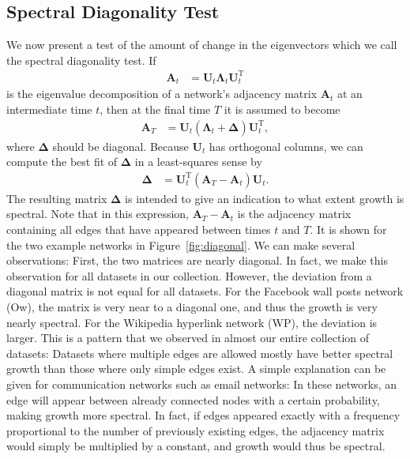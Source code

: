 \documentclass[11pt,a4paper]{book}
\newcommand{\totaltime}{T} %
\begin{document}
\subsection{Spectral Diagonality Test}
\label{sec:spectral-diagonality-test}
We now present a test of the amount of change in the eigenvectors which
we call the spectral diagonality test.  If
\begin{align*}
  \mathbf A_{t}^{\phantom{\mathrm{I}}} &= \mathbf
  U_{t}^{\phantom{\mathrm{I}}}\mathbf \Lambda_{t}^{\phantom{\mathrm
      I}} \mathbf U_{t}^{\mathrm T} 
\end{align*}
is the eigenvalue decomposition of a network's adjacency matrix $\mathbf
A_t$ at an intermediate time $t$, then at the final time $T$ it is
assumed to become
\begin{align*}
  \mathbf A_{\totaltime}^{\phantom {\mathrm I}}&=\mathbf U_{t}^{\phantom
    {\mathrm I}} (\mathbf  
  \Lambda_{t}^{\phantom {\mathrm I}}+\mathbf \Delta)\mathbf
  U_{t}^{\mathrm T},
\end{align*}
where $\mathbf \Delta$ should be diagonal.  
Because $\mathbf U_{t}$ has orthogonal columns, 
we can compute the best fit of $\mathbf \Delta$ in a least-squares
sense by
\begin{align}
  \mathbf \Delta &= \mathbf U_{t}^{\mathrm T} (\mathbf
  A_{\totaltime}^{\phantom {\mathrm I}} - \mathbf 
  A_{t}^{\phantom {\mathrm I}})\mathbf U_{t}^{\phantom
    {\mathrm I}}. \label{eq:diagonality}
\end{align}
The resulting matrix $\mathbf \Delta$ is intended to give an indication to what
extent growth is spectral.  Note that in this expression, $\mathbf
A_{\totaltime} - \mathbf A_{t}$ is the adjacency matrix containing all
edges that have appeared between times $t$ and $T$.  It is shown for the
two example networks in Figure~\ref{fig:diagonal}.  We can make
several observations: First, the two matrices are nearly diagonal.  In
fact, we make this observation for all datasets in our collection.
However, the deviation from a diagonal matrix is not equal for all
datasets.  For the Facebook wall posts network (\textsf{Ow}), the matrix
is very near to a diagonal one, and thus the growth is very nearly
spectral.  
For the Wikipedia hyperlink network (\textsf{WP}), the
deviation is larger.  This is a pattern that we observed in almost our
entire collection of datasets: Datasets where multiple edges are allowed
mostly have better spectral growth than those where only simple edges
exist.  A simple explanation can be given for communication networks
such as email networks: In these networks, an edge will appear between
already connected nodes with a certain probability, making growth more
spectral.  In fact, if edges appeared exactly with a frequency
proportional to the number of previously existing edges, the adjacency
matrix would simply be multiplied by a constant, and growth would thus
be spectral.
\end{document}
